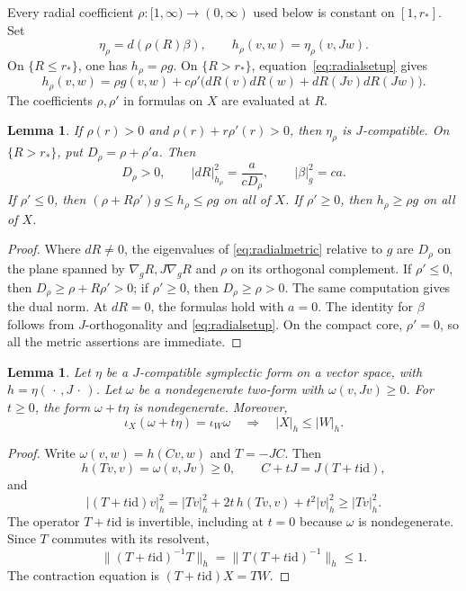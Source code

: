 \documentclass[11pt,a4paper]{article}
\newtheorem{lemma}[theorem]{Lemma}
\theoremstyle{remark}
\newcommand{\id}{\mathrm{id}}
\newcommand{\abs}[1]{\lvert #1\rvert}
\newcommand{\norm}[1]{\lVert #1\rVert}
\numberwithin{equation}{section}
\begin{document}
Every radial coefficient $\rho:[1,\infty)\to(0,\infty)$ used below is constant on $[1,r_*]$. Set
\[
\eta_\rho=d(\rho(R)\beta),\qquad
h_\rho(v,w)=\eta_\rho(v,Jw).
\]
On $\{R\le r_*\}$, one has $h_\rho=\rho g$. On $\{R>r_*\}$, equation~\eqref{eq:radialsetup} gives
\begin{equation}\label{eq:radialmetric}
h_\rho(v,w)=\rho g(v,w)
+c\rho'\bigl(dR(v)dR(w)+dR(Jv)dR(Jw)\bigr).
\end{equation}
The coefficients $\rho,\rho'$ in formulas on $X$ are evaluated at $R$.

\begin{lemma}\label{lem:metric}
If $\rho(r)>0$ and $\rho(r)+r\rho'(r)>0$, then $\eta_\rho$ is $J$-compatible. On $\{R>r_*\}$, put $D_\rho=\rho+\rho'a$. Then
\begin{equation}\label{eq:duals}
D_\rho>0,\qquad
\abs{dR}_{h_\rho}^2=\frac{a}{cD_\rho},\qquad
\abs{\beta}_g^2=ca.
\end{equation}
If $\rho'\le0$, then $(\rho+R\rho')g\le h_\rho\le\rho g$ on all of $X$. If $\rho'\ge0$, then $h_\rho\ge\rho g$ on all of $X$.
\end{lemma}

\begin{proof}
Where $dR\ne0$, the eigenvalues of \eqref{eq:radialmetric} relative to $g$ are $D_\rho$ on the plane spanned by $\nabla_gR,J\nabla_gR$ and $\rho$ on its orthogonal complement. If $\rho'\le0$, then $D_\rho\ge\rho+R\rho'>0$; if $\rho'\ge0$, then $D_\rho\ge\rho>0$. The same computation gives the dual norm. At $dR=0$, the formulas hold with $a=0$. The identity for $\beta$ follows from $J$-orthogonality and \eqref{eq:radialsetup}. On the compact core, $\rho'=0$, so all the metric assertions are immediate.
\end{proof}

\begin{lemma}\label{lem:linear}
Let $\eta$ be a $J$-compatible symplectic form on a vector space, with $h=\eta(\,\cdot\,,J\,\cdot\,)$. Let $\omega$ be a nondegenerate two-form with $\omega(v,Jv)\ge0$. For $t\ge0$, the form $\omega+t\eta$ is nondegenerate. Moreover,
\[
\iota_X(\omega+t\eta)=\iota_W\omega
\quad\Longrightarrow\quad \abs{X}_h\le\abs{W}_h.
\]
\end{lemma}

\begin{proof}
Write $\omega(v,w)=h(Cv,w)$ and $T=-JC$. Then
\[
h(Tv,v)=\omega(v,Jv)\ge0,\qquad C+tJ=J(T+t\id),
\]
and
\[
\abs{(T+t\id)v}_h^2
=\abs{Tv}_h^2+2t\,h(Tv,v)+t^2\abs{v}_h^2
\ge\abs{Tv}_h^2.
\]
The operator $T+t\id$ is invertible, including at $t=0$ because $\omega$ is nondegenerate. Since $T$ commutes with its resolvent,
\[
\norm{(T+t\id)^{-1}T}_h
=\norm{T(T+t\id)^{-1}}_h\le1.
\]
The contraction equation is $(T+t\id)X=TW$.
\end{proof}
\end{document}
